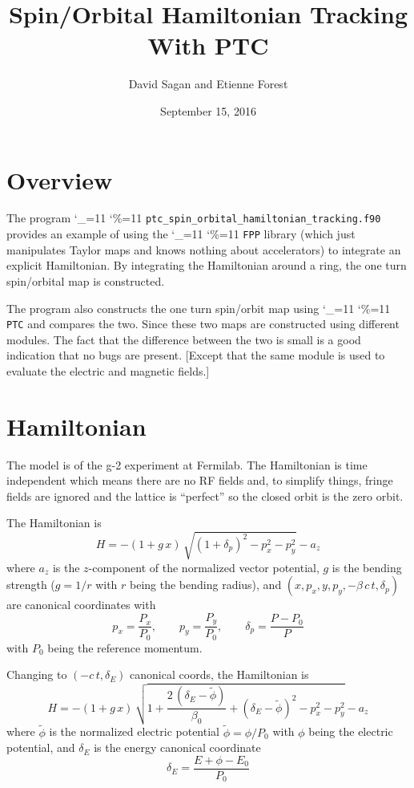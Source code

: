 \documentclass[11pt,openany]{article}
\title{Spin/Orbital Hamiltonian Tracking With PTC}
\author{David Sagan and Etienne Forest}
\date{September 15, 2016}
\newcommand\dottcmd[1]{\texttt{#1}\endgroup}
\newcommand{\vn}{\begingroup\catcode`\_=11 \catcode`\%=11 \dottcmd}
\newcommand{\wt}{\widetilde}
\begin{document}
\maketitle

\section{Overview}

The program \vn{ptc_spin_orbital_hamiltonian_tracking.f90} provides an example of using the
\vn{FPP} library (which just manipulates Taylor maps and knows nothing about accelerators)
to integrate an explicit Hamiltonian. By integrating the Hamiltonian around a ring, the
one turn spin/orbital map is constructed. 

The program also constructs the one turn spin/orbit map using \vn{PTC} and compares the
two. Since these two maps are constructed using different modules. The fact that the
difference between the two is small is a good indication that no bugs are present. [Except
that the same module is used to evaluate the electric and magnetic fields.]

\section{Hamiltonian}

The model is of the g-2 experiment at Fermilab. The Hamiltonian is time independent which
means there are no RF fields and, to simplify things, fringe fields are ignored and the
lattice is ``perfect'' so the closed orbit is the zero orbit.

The Hamiltonian is
\begin{equation}
  H = -(1 + g \, x) \, \sqrt{(1 + \delta_p)^2 - p_x^2 - p_y^2} - a_z
\end{equation}
where $a_z$ is the $z$-component of the normalized vector potential, $g$ is the bending
strength ($g = 1 /r$ with $r$ being the bending radius), and $(x, p_x, y, p_y, -\beta \, c
\, t, \delta_p)$ are canonical coordinates with
\begin{equation}
  p_x = \frac{P_x}{P_0}, \qquad p_y = \frac{P_y}{P_0}, \qquad \delta_p = \frac{P - P_0}{P} 
\end{equation}
with $P_0$ being the reference momentum.

Changing to $(-c \, t, \delta_E)$ canonical coords, the Hamiltonian is
\begin{equation}
  H = -(1 + g \, x) \, \sqrt{1 + 
    \frac{2 \, (\delta_E - \wt\phi)}{\beta_0} + (\delta_E - \wt\phi)^2 - p_x^2 - p_y^2} - a_z
\end{equation}
where $\wt\phi$ is the normalized electric potential $\wt\phi = \phi/P_0$ with $\phi$ being
the electric potential, and $\delta_E$ is the energy canonical coordinate
\begin{equation}
  \delta_E = \frac{E + \phi - E_0}{P_0}
\end{equation}
\end{document}

